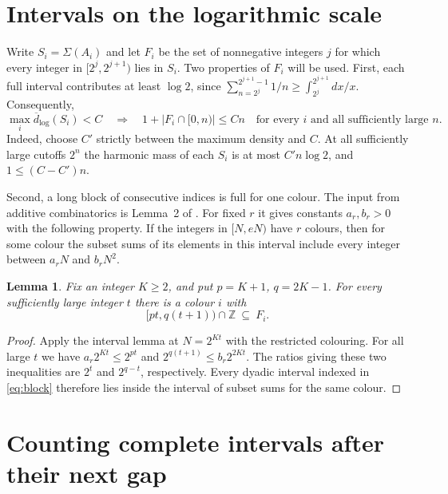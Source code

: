 \documentclass[11pt]{article}
\newtheorem{lemma}[theorem]{Lemma}
\newcommand{\dd}{\overline d_{\log}}
\newcommand{\card}[1]{\lvert#1\rvert}
\begin{document}
\section{Intervals on the logarithmic scale}

Write $S_i=\Sigma(A_i)$ and let $F_i$ be the set of nonnegative integers
$j$ for which every integer in $[2^j,2^{j+1})$ lies in $S_i$.
Two properties of $F_i$ will be used. First, each full interval
contributes at least $\log 2$, since
$\sum_{n=2^j}^{2^{j+1}-1}1/n\ge\int_{2^j}^{2^{j+1}}dx/x$.
Consequently,
\begin{equation}\label{eq:cap}
 \max_i\dd(S_i)<C
 \quad\Longrightarrow\quad
 1+\card{F_i\cap[0,n)}\le Cn
 \quad\text{for every $i$ and all sufficiently large $n$.}
\end{equation}
Indeed, choose $C'$ strictly between the maximum density and $C$.
At all sufficiently large cutoffs $2^n$ the harmonic mass of each
$S_i$ is at most $C'n\log 2$, and $1\le (C-C')n$.

Second, a long block of consecutive indices is full for one colour.
The input from additive combinatorics is Lemma~2 of \cite{cfp}.
For fixed $r$ it gives constants $a_r,b_r>0$ with the following
property. If the integers in $[N,eN)$ have $r$ colours, then for some
colour the subset sums of its elements in this interval include every
integer between $a_r N$ and $b_r N^2$.

\begin{lemma}\label{lem:interval}
Fix an integer $K\ge2$, and put $p=K+1$, $q=2K-1$.
For every sufficiently large integer $t$ there is a colour $i$ with
\begin{equation}\label{eq:block}
 [pt,q(t+1))\cap\mathbb Z\ \subseteq\ F_i .
\end{equation}
\end{lemma}
\begin{proof}
Apply the interval lemma at $N=2^{Kt}$ with the restricted colouring.
For all large $t$ we have $a_r2^{Kt}\le2^{pt}$ and
$2^{q(t+1)}\le b_r2^{2Kt}$. The ratios giving these two inequalities
are $2^t$ and $2^{q-t}$, respectively.
Every dyadic interval indexed in \eqref{eq:block} therefore lies
inside the interval of subset sums for the same colour.
\end{proof}

\section{Counting complete intervals after their next gap}
\end{document}
